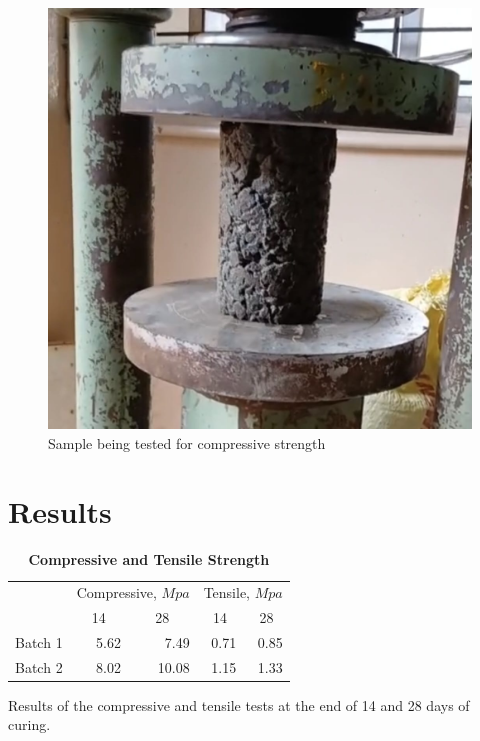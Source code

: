 \documentclass{ieeeaccess}
\begin{document}
\begin{figure}[h]
    \caption{Sample being tested for compressive strength}
    \centering
    \includegraphics[scale=0.15]{compressive}
\end{figure}



\section{Results}

\begin{table}[htb]
    \begin{threeparttable}
        \caption{\textbf{Compressive and Tensile Strength}}
        \label{table:str-test}
        \setlength{\tabcolsep}{16.5pt}
        \def\arraystretch{1.5}%
        \begin{tabular}{ l r r r r }
            \hline
            & \multicolumn{2}{c}{Compressive, $Mpa$} & 
                \multicolumn{2}{c}{Tensile, $Mpa$} \\

            \cline{2-5}
            & \multicolumn{1}{c}{14} & \multicolumn{1}{c}{28} & 
                \multicolumn{1}{c}{14} & \multicolumn{1}{c}{28} \\

            \hline

            Batch 1 & 5.62 & 7.49  & 0.71 & 0.85 \\
            Batch 2 & 8.02 & 10.08 & 1.15 & 1.33 \\

            \hline
        \end{tabular} 
        \begin{tablenotes}
            \item Results of the compressive and tensile tests at the end of 
            14 and 28 days of curing.
        \end{tablenotes}
    \end{threeparttable}
\end{table}
\end{document}

